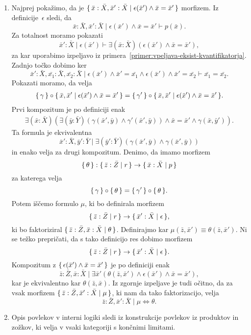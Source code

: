 \documentclass[../kategoricna_logika.tex]{subfiles}
\begin{document}
\begin{dokaz}
\begin{enumerate}[label=(\roman*)]
  \item Najprej pokažimo, da je
    $\lbrace\,\bar{x}:\bar{X}, \bar{x}':\bar{X} \mid \epsilon(\bar{x}') \land \bar{x} = \bar{x}'\,\rbrace$
    morfizem.  Iz
    definicije~$\epsilon$ sledi, da
    $$\bar{x}:\bar{X}, \bar{x}':\bar{X} \mid \epsilon(\bar{x}') \land \bar{x} = \bar{x}' \vdash p(\bar{x}).$$
    Za totalnost moramo pokazati
    \[\bar{x}':\bar{X} \mid \epsilon(\bar{x}') \vdash \exists (\bar{x}:\bar{X}) (\epsilon(\bar{x}') \land \bar{x}=\bar{x}'),\]
    za kar uporabimo izpeljavo iz primera~\ref{primer:vpeljava-eksist-kvantifikatorja}.
    Zadnjo točko dobimo ker
    \[\bar{x}':\bar{X},\bar{x_1}:\bar{X},\bar{x_2}:\bar{X} \mid \epsilon(\bar{x}') \land \bar{x}'=\bar{x_1} \land \epsilon(\bar{x}') \land \bar{x}'= \bar{x_2}
      \vdash \bar{x_1} = \bar{x_2}.\]
    Pokazati moramo, da velja
\begin{align*}
    \lbrace\,\gamma\,\rbrace \circ \lbrace\,\bar{x}, \bar{x}' \mid \epsilon(\bar{x}') \land \bar{x} = \bar{x}'\,\rbrace = 
  \lbrace\,\gamma'\,\rbrace \circ \lbrace\,\bar{x},\bar{x}' \mid \epsilon(\bar{x}') \land \bar{x} = \bar{x}'\,\rbrace.
  \end{align*}
    Prvi kompozitum je po
    definiciji enak
\begin{align*}
    \exists (\bar{x}:\bar{X})( \exists (\bar{y}:\bar{Y})(\gamma(\bar{x}',\bar{y}) \land \gamma'(\bar{x}',\bar{y})) \land \bar{x} = \bar{x}' \land \gamma(\bar{x},\bar{y}')).
  \end{align*}
  Ta formula je
  ekvivalentna
  $$\bar{x}':\bar{X},\bar{y}':\bar{Y} \mid \exists (\bar{y}':\bar{Y})(\gamma(\bar{x}',\bar{y}) \land \gamma(\bar{x}',\bar{y}))$$
  in enako velja za drugi kompozitum.  Denimo, da imamo morfizem
    \[\lbrace\,\theta\,\rbrace : \lbrace\,\bar{z}:\bar{Z} \mid r\,\rbrace \to \lbrace\,\bar{x}:\bar{X} \mid p\,\rbrace\]
    za katerega velja
    \[\lbrace\,\gamma\,\rbrace \circ \lbrace\,\theta\,\rbrace = \lbrace\,\gamma'\,\rbrace \circ \lbrace\,\theta\,\rbrace.\]
    Potem iščemo formulo $\mu$, ki bo definirala
    morfizem
    $$\lbrace\,\bar{z}:\bar{Z} \mid r\,\rbrace \to \lbrace\,\bar{x}':\bar{X} \mid \epsilon\,\rbrace,$$
    ki bo
    faktoriziral $\lbrace\,\bar{z}:\bar{Z},\bar{x}:\bar{X} \mid \theta\,\rbrace$.
    Definirajmo kar
    $\mu(\bar{z},\bar{x}') \equiv \theta(\bar{z},\bar{x}')$. Ni se težko prepričati, da s tako
    definicijo res dobimo morfizem
    $$\lbrace\,\bar{z}:\bar{Z} \mid r\,\rbrace \to \lbrace\,\bar{x}':\bar{X} \mid \epsilon\,\rbrace.$$
    Kompozitum z
    $\lbrace\,\epsilon(\bar{x}') \land \bar{x} = \bar{x}'\,\rbrace$ je po definiciji enak
    \[ \bar{z}:\bar{Z}, \bar{x}:\bar{X} \mid \exists \bar{x}' (\theta(\bar{z},\bar{x}') \land \epsilon(\bar{x}') \land \bar{x}=\bar{x}'),\]
    kar je ekvivalentno kar $\theta(\bar{z},\bar{x})$.  Iz
    zgornje izpeljave je tudi očitno, da za vsak morfizem $\lbrace\,\bar{z}:\bar{Z},\bar{x}':\bar{X} \mid \mu\,\rbrace$,
    ki nam da tako faktorizacijo, velja
    \[\bar{z}:\bar{Z},\bar{x}':\bar{X} \mid \mu \iff \theta.\]

  \item Opis povlekov v interni logiki sledi iz konstrukcije povlekov
    iz produktov in zožkov, ki velja v vsaki kategoriji s končnimi
    limitami.
  \end{enumerate}
\end{dokaz}
\end{document}
